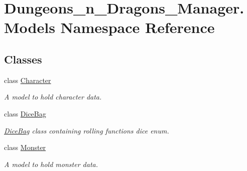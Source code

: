 \hypertarget{namespace_dungeons__n___dragons___manager_1_1_models}{}\section{Dungeons\+\_\+n\+\_\+\+Dragons\+\_\+\+Manager.\+Models Namespace Reference}
\label{namespace_dungeons__n___dragons___manager_1_1_models}
\subsection*{Classes}
\begin{DoxyCompactItemize}
\item 
class \mbox{\hyperlink{class_dungeons__n___dragons___manager_1_1_models_1_1_character}{Character}}
\begin{DoxyCompactList}\small\item\em A model to hold character data. \end{DoxyCompactList}\item 
class \mbox{\hyperlink{class_dungeons__n___dragons___manager_1_1_models_1_1_dice_bag}{Dice\+Bag}}
\begin{DoxyCompactList}\small\item\em \mbox{\hyperlink{class_dungeons__n___dragons___manager_1_1_models_1_1_dice_bag}{Dice\+Bag}} class containing rolling functions dice enum. \end{DoxyCompactList}\item 
class \mbox{\hyperlink{class_dungeons__n___dragons___manager_1_1_models_1_1_monster}{Monster}}
\begin{DoxyCompactList}\small\item\em A model to hold monster data. \end{DoxyCompactList}\end{DoxyCompactItemize}
